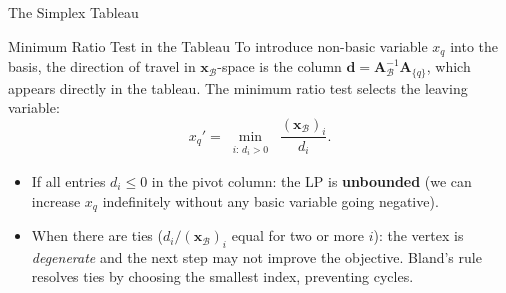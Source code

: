 \documentclass[aspectratio=169,10pt]{beamer}
\newcommand{\xv}{\mathbf{x}}
\newcommand{\Av}{\mathbf{A}}
\newcommand{\calB}{\mathcal{B}}
\begin{document}
\begin{frame}[allowframebreaks]{The Simplex Tableau}
\begin{block}{Minimum Ratio Test in the Tableau}
To introduce non-basic variable $x_q$ into the basis, the direction of travel in
$\xv_\calB$-space is the column $\mathbf{d} = \Av_\calB^{-1}\Av_{\{q\}}$, which
appears directly in the tableau.  The minimum ratio test selects the leaving
variable:
\[
  x_q' = \min_{\substack{i:\,d_i > 0}}\;\frac{(\xv_\calB)_i}{d_i}.
\]
\begin{itemize}
  \item If all entries $d_i \le 0$ in the pivot column: the LP is \textbf{unbounded}
        (we can increase $x_q$ indefinitely without any basic variable going negative).
  \item When there are ties ($d_i / (\xv_\calB)_i$ equal for two or more $i$): the
        vertex is \emph{degenerate} and the next step may not improve the objective.
        Bland's rule resolves ties by choosing the smallest index, preventing cycles.
\end{itemize}
\end{block}

\end{frame}
\end{document}
